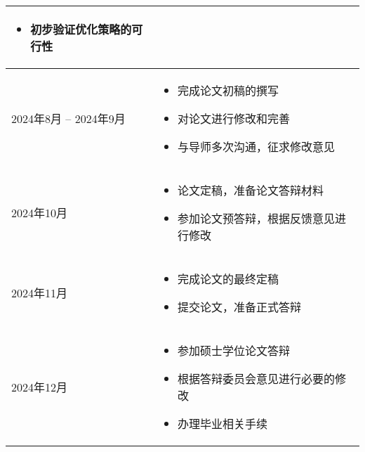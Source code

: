 \begin{table}[htbp]
{\begin{tabular}{lp{10cm}}
\begin{itemize}
        \item 初步验证优化策略的可行性
      \end{itemize} \\
      \hline
      2024年8月 -- 2024年9月 & 
      \begin{itemize}
        \item 完成论文初稿的撰写
        \item 对论文进行修改和完善
        \item 与导师多次沟通，征求修改意见
      \end{itemize} \\
      \hline
      2024年10月 & 
      \begin{itemize}
        \item 论文定稿，准备论文答辩材料
        \item 参加论文预答辩，根据反馈意见进行修改
      \end{itemize} \\
      \hline
      2024年11月 & 
      \begin{itemize}
        \item 完成论文的最终定稿
        \item 提交论文，准备正式答辩
      \end{itemize} \\
      \hline
      2024年12月 & 
      \begin{itemize}
        \item 参加硕士学位论文答辩
        \item 根据答辩委员会意见进行必要的修改
        \item 办理毕业相关手续
      \end{itemize} \\
      \hline
    \end{tabular}
  }
  \label{tab:schedule}
\end{table}